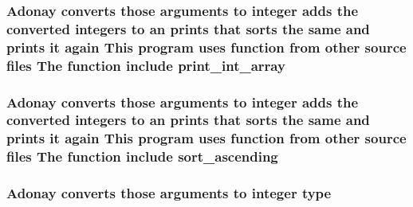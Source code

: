 \subsubsection[{print\+\_\+int\+\_\+array}]{\setlength{\rightskip}{0pt plus 5cm}Adonay converts those arguments to integer adds the converted integers to an prints that sorts the same and prints it again This program uses function from other source files The function include print\+\_\+int\+\_\+array}\label{readme_8txt_a800e6351d04c08a36c07d6e9871b7771}
\subsubsection[{sort\+\_\+ascending}]{\setlength{\rightskip}{0pt plus 5cm}Adonay converts those arguments to integer adds the converted integers to an prints that sorts the same and prints it again This program uses function from other source files The function include sort\+\_\+ascending}\label{readme_8txt_a8876740fc17331e967917bf66e441150}
\subsubsection[{type}]{\setlength{\rightskip}{0pt plus 5cm}Adonay converts those arguments to integer type}\label{readme_8txt_af246a86d1810514ff7ae8048a96c98e2}
